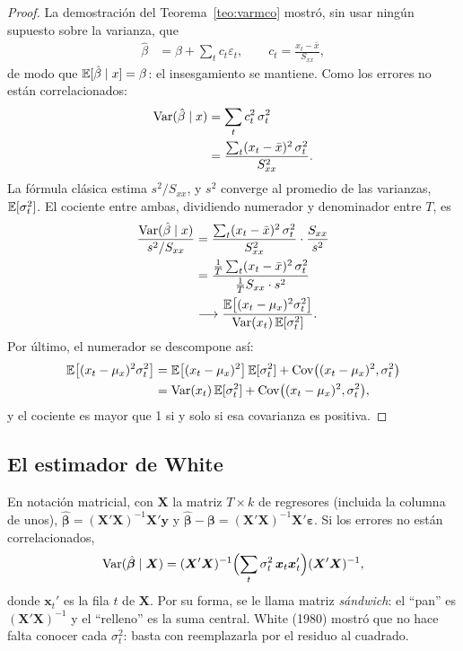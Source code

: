 \begin{proof}
La demostración del Teorema~\ref{teo:varmco} mostró, sin usar ningún supuesto sobre la varianza, que
\begin{align*}
  \hat\beta &= \beta+\sum_tc_t\varepsilon_t, \qquad c_t=\frac{x_t-\bar x}{S_{xx}},
\end{align*}
de modo que $\mathbb{E}[\hat\beta\mid x]=\beta$: el insesgamiento se mantiene. Como los errores no están
correlacionados:
\begin{align*}
  \operatorname{Var}(\hat\beta\mid x) &= \sum_tc_t^2\,\sigma_t^2\\
                        &= \frac{\sum_t(x_t-\bar x)^2\,\sigma_t^2}{S_{xx}^2} .
\end{align*}
La fórmula clásica estima $s^2/S_{xx}$, y $s^2$ converge al promedio de las varianzas, $\mathbb{E}[\sigma_t^2]$. El
cociente entre ambas, dividiendo numerador y denominador entre $T$, es
\begin{align*}
  \frac{\operatorname{Var}(\hat\beta\mid x)}{s^2/S_{xx}}
    &= \frac{\sum_t(x_t-\bar x)^2\,\sigma_t^2}{S_{xx}^2}\cdot\frac{S_{xx}}{s^2}\\
    &= \frac{\frac1T\sum_t(x_t-\bar x)^2\,\sigma_t^2}{\frac1TS_{xx}\cdot s^2}\\
    &\longrightarrow \frac{\mathbb{E}\bigl[(x_t-\mu_x)^2\sigma_t^2\bigr]}{\operatorname{Var}(x_t)\,\mathbb{E}[\sigma_t^2]} .
\end{align*}
Por último, el numerador se descompone así:
\begin{align*}
  \mathbb{E}\bigl[(x_t-\mu_x)^2\sigma_t^2\bigr] &= \mathbb{E}\bigl[(x_t-\mu_x)^2\bigr]\,\mathbb{E}[\sigma_t^2]+\operatorname{Cov}\bigl((x_t-\mu_x)^2,\sigma_t^2\bigr)\\
                                        &= \operatorname{Var}(x_t)\,\mathbb{E}[\sigma_t^2]+\operatorname{Cov}\bigl((x_t-\mu_x)^2,\sigma_t^2\bigr),
\end{align*}
y el cociente es mayor que 1 si y solo si esa covarianza es positiva.
\end{proof}

\subsection{El estimador de White}

En notación matricial, con $\bm X$ la matriz $T\times k$ de regresores (incluida la columna de unos),
$\hat{\bm\beta}=(\bm X'\bm X)^{-1}\bm X'\bm y$ y $\hat{\bm\beta}-\bm\beta=(\bm X'\bm X)^{-1}\bm X'\bm\varepsilon$.
Si los errores no están correlacionados,
\[
  \operatorname{Var}(\hat{\bm\beta}\mid\bm X)=(\bm X'\bm X)^{-1}\Bigl(\sum_t\sigma_t^2\,\bm x_t\bm x_t'\Bigr)(\bm X'\bm X)^{-1},
\]
donde $\bm x_t'$ es la fila $t$ de $\bm X$. Por su forma, se le llama matriz \emph{sándwich}: el ``pan'' es
$(\bm X'\bm X)^{-1}$ y el ``relleno'' es la suma central. White (1980) mostró que no hace falta conocer cada
$\sigma_t^2$: basta con reemplazarla por el residuo al cuadrado.

